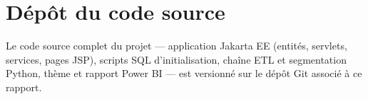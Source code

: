 \section{Dépôt du code source}
Le code source complet du projet --- application Jakarta EE (entités, servlets,
services, pages JSP), scripts SQL d'initialisation, chaîne ETL et segmentation
Python, thème et rapport Power BI --- est versionné sur le dépôt Git associé à ce
rapport.
